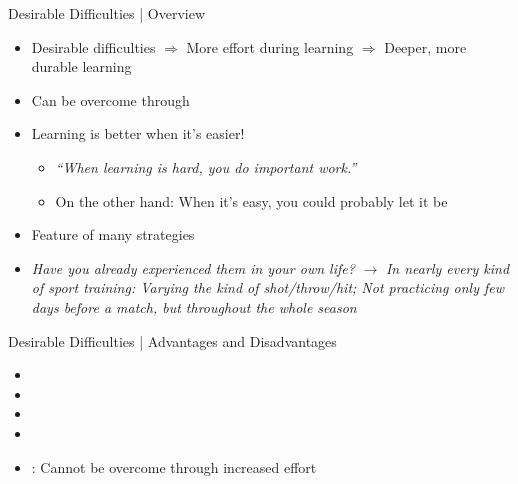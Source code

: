 \documentclass{ercisbeamer}
\begin{document}
\begin{frame}{Desirable Difficulties | Overview}
    \begin{tbox}
        \begin{itemize}
            \item Desirable difficulties $\Rightarrow$ More effort during learning $\Rightarrow$ Deeper, more durable learning
            \item Can be overcome through 
            \item Learning is  better when it's easier!
            \begin{itemize}
                \item \emph{``When learning is hard, you do important work.'' }
                \item On the other hand: When it's easy, you could probably let it be
            \end{itemize}
            \item Feature of many  strategies 
            \item \emph{Have you already experienced them in your own life?} \pause $\rightarrow$ \emph{In nearly every kind of sport training: Varying the kind of shot/throw/hit; Not practicing only few days before a match, but throughout the whole season}
        \end{itemize}
    \end{tbox}
\end{frame}
\setbgimage{}

\begin{frame}{Desirable Difficulties | Advantages and Disadvantages}
    \begin{itemize}
        \item {} 
        \item {} 
        \item {}
        \item {}  
        \item {}: Cannot be overcome through increased effort
    \end{itemize}
\end{frame}
\end{document}
